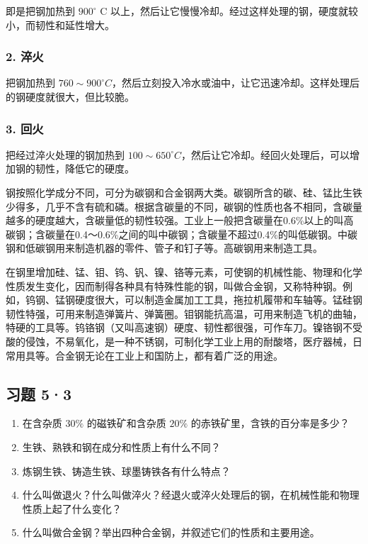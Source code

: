 即是把钢加热到 \(900^{\circ}\) C
以上，然后让它慢慢冷却。经过这样处理的钢，硬度就较小，而韧性和延性增大。

\subsubsection{2. 淬火}

把钢加热到
\(760 \sim 900^{\circ}C\)，然后立刻投入冷水或油中，让它迅速冷却。这样处理后的钢硬度就很大，但比较脆。

\subsubsection{3. 回火}

把经过淬火处理的钢加热到
\(100 \sim 650^{\circ}C\)，然后让它冷却。经回火处理后，可以增加钢的韧性，降低它的硬度。

钢按照化学成分不同，可分为碳钢和合金钢两大类。碳钢所含的碳、硅、锰比生铁少得多，几乎不含有硫和磷。根据含碳量的不同，碳钢的性质也各不相同，含碳量越多的硬度越大，含碳量低的韧性较强。工业上一般把含碳量在0.6\%以上的叫高碳钢；含碳量在0.4～0.6\%之间的叫中碳钢；含碳量不超过0.4\%的叫低碳钢。中碳钢和低碳钢用来制造机器的零件、管子和钉子等。高碳钢用来制造工具。

在钢里增加硅、锰、钼、钨、钒、镍、铬等元素，可使钢的机械性能、物理和化学性质发生变化，因而制得各种具有特殊性能的钢，叫做合金钢，又称特种钢。例如，钨钢、锰钢硬度很大，可以制造金属加工工具，拖拉机履带和车轴等。锰硅钢韧性特强，可用来制造弹簧片、弹簧圈。钼钢能抗高温，可用来制造飞机的曲轴，特硬的工具等。钨铬钢（又叫高速钢）硬度、韧性都很强，可作车刀。镍铬钢不受酸的侵蚀，不易氧化，是一种不锈钢，可制化学工业上用的耐酸塔，医疗器械，日常用具等。合金钢无论在工业上和国防上，都有着广泛的用途。

\subsection{习题 5·3}

\begin{enumerate}
\item
  在含杂质 \(30\%\) 的磁铁矿和含杂质 \(20\%\)
  的赤铁矿里，含铁的百分率是多少？
\item
  生铁、熟铁和钢在成分和性质上有什么不同？
\item
  炼钢生铁、铸造生铁、球墨铸铁各有什么特点？
\item
  什么叫做退火？什么叫做淬火？经退火或淬火处理后的钢，在机械性能和物理性质上起了什么变化？
\item
  什么叫做合金钢？举出四种合金钢，并叙述它们的性质和主要用途。
\end{enumerate}

